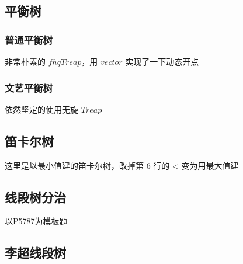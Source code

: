 \documentclass[12pt]{article}
\begin{document}


\newpage

\subsection{平衡树}

\subsubsection{普通平衡树}

非常朴素的 $fhqTreap$，用 $vector$ 实现了一下动态开点



\newpage

\subsubsection{文艺平衡树}

依然坚定的使用无旋 $Treap$



\subsection{笛卡尔树}

这里是以最小值建的笛卡尔树，改掉第 6 行的 < 变为用最大值建



\newpage

\subsection{线段树分治}

以\href{https://www.luogu.com.cn/problem/P5787}{P5787}为模板题



\newpage

\subsection{李超线段树}


\end{document}
